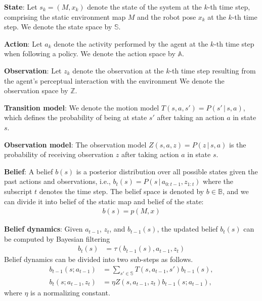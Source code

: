 \documentclass[letterpaper, 10 pt, conference]{ieeeconf}  %
\newcommand{\ph}[1]{{\textbf{#1}:}} %
\begin{document}

\ph{State}
Let $s_k = (M, x_k)$ denote the state of the system at the $k$-th time step, comprising the static environment map $M$ and the robot pose $x_k$ at the $k$-th time step. We denote the state space by $\mathbb{S}$.

\ph{Action}
Let $a_k$ denote the activity performed by the agent at the $k$-th time step when following a policy. We denote the action space by $\mathbb{A}$.  

\ph{Observation}
Let $z_k$ denote the observation at the $k$-th time step resulting from the agent's perceptual interaction with the environment We denote the observation space by $\mathbb{Z}$. 

\ph{Transition model}
We denote the motion model $T(s, a, s') = P(s'\,|\,s, a)$, which defines the probability of being at state $s'$ after taking an action $a$ in state $s$.

\ph{Observation model}
The observation model $Z(s, a, z) = P(z\,|\,s, a)$ is the probability of receiving observation $z$ after taking action $a$ in state $s$. 

\ph{Belief}
A belief $b(s)$ is a posterior distribution over all possible states given the past actions and observations, i.e., $b_{t}(s) = P(s \,|\, a_{0:t-1}, z_{1:t})$ where the subscript $t$ denotes the time step. The belief space is denoted by $b \in \mathbb{B}$, and we can divide it into belief of the static map and belief of the state:
\begin{align}
    b(s) = p(M,x)
\end{align}

\ph{Belief dynamics}
Given $a_{t-1}$, $z_t$, and $b_{t-1}(s)$,
the updated belief $b_t(s)$ can be computed by Bayesian filtering
\begin{align}
  b_t(s) &= \tau (b_{t-1}(s), a_{t-1}, z_t)
  \label{eq:tau-belief}
\end{align}
Belief dynamics can be divided into two sub-steps as follows.
\begin{align}
  b_{t-1}(s; a_{t-1}) &= \sum_{s' \in \mathbb{S}} T(s, a_{t-1}, s') b_{t-1}(s),
  \label{eq:prediction}
  \\
  b_t(s; a_{t-1}, z_t) &= \eta Z(s, a_{t-1}, z_t) b_{t-1}(s; a_{t-1}),
  \label{eq:correction}
\end{align}
where $\eta$ is a normalizing constant.
\end{document}
